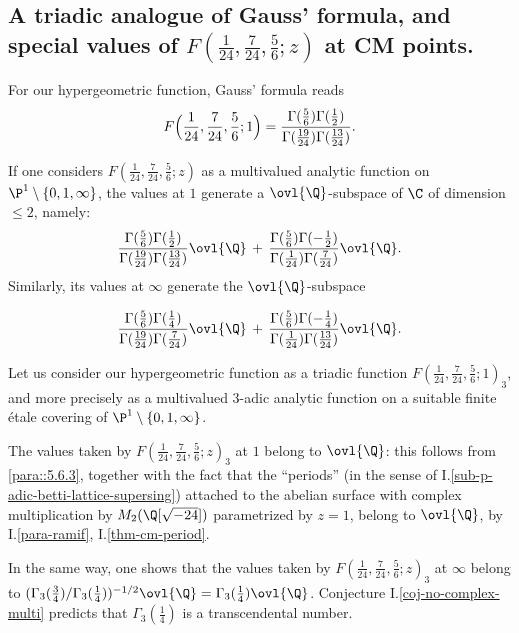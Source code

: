 \subsection{A triadic analogue of Gauss' formula, and special values of
$F(\frac{1}{24}, \frac{7}{24},\frac{5}{6}; z)$ at CM points.}\label{sub::6.6}


\begin{para}\label{para::6.6.1} For our hypergeometric function, Gauss'
 formula reads
 \begin{equation*}
  F\Bigl(\frac{1}{24}, \frac{7}{24},\frac{5}{6};1\Bigr)=
 \frac{\Gamma(\frac{5}{6})\Gamma(\frac{1}{2})}
 {\Gamma(\frac{19}{24})\Gamma(\frac{13}{24})}.
 \end{equation*}

\noindent If one considers $F(\frac{1}{24}, \frac{7}{24},\frac{5}{6};
 z)$ as a multivalued analytic function on
 $\P^1\setminus\{0,1,\infty\}$, the values at $1$ generate a
 $\ovl{\Q}$-subspace of $\C$ of dimension $\leq 2$, namely:  
\begin{equation*}
 \frac{\Gamma(\frac{5}{6})\Gamma(\frac{1}{2})}
  {\Gamma(\frac{19}{24})\Gamma(\frac{13}{24})}\ovl{\Q} \,+ \,
  \frac{\Gamma(\frac{5}{6})\Gamma(-\frac{1}{2})}
  {\Gamma(\frac{1}{24})\Gamma(\frac{7}{24})}\ovl{\Q}.
\end{equation*}
Similarly, its values at $\infty$ generate the $\ovl{\Q}$-subspace 

\begin{equation*}
 \frac{\Gamma(\frac{5}{6})\Gamma(\frac{1}{4})}
  {\Gamma(\frac{19}{24})\Gamma(\frac{7}{24})}\ovl{\Q} \, +\,
  \frac{\Gamma(\frac{5}{6})\Gamma(-\frac{1}{4})}
  {\Gamma(\frac{1}{24})\Gamma(\frac{13}{24})}\ovl{\Q}.
\end{equation*}   
\end{para}

\begin{para}\label{para::6.6.2} Let us consider our hypergeometric
 function as a triadic function $F(\frac{1}{24},
 \frac{7}{24},\frac{5}{6}; 1)_3$, and more precisely as a multivalued
 $3$-adic analytic function on a suitable finite \'etale covering of
 $\P^1\setminus\{0,1,\infty\}$. 
 
 The values taken by $F(\frac{1}{24}, \frac{7}{24},\frac{5}{6}; z)_3$ at
 $1$ belong to $\ovl{\Q}$: this follows from \ref{para::5.6.3}, together
 with the fact that the ``periods'' (in the sense of
 I.\ref{sub-p-adic-betti-lattice-supersing}) attached to the 
 abelian surface with complex multiplication by $M_2(\Q[\sqrt{-24}])$ 
 parametrized by $z=1$, belong to $\ovl{\Q}$, by I.\ref{para-ramif}, 
 I.\ref{thm-cm-period}. 

 \medskip In the same way, one shows that the values taken by
 $F(\frac{1}{24}, \frac{7}{24},\frac{5}{6}; z)_3$ at $\infty$ belong to 
 $(\Gamma_3(\frac{3}{4})/\Gamma_3(\frac{1}{4}))^{-1/2}
 \ovl{\Q}=\Gamma_3(\frac{1}{4})\ovl{\Q}$.
 Conjecture I.\ref{coj-no-complex-multi} predicts that
 $\Gamma_3(\frac{1}{4})$ is a transcendental number.
\end{para}


